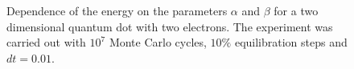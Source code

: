 	
	\begin{figure}[!hbt]
    \begin{center}
      \caption{Dependence of the energy on the parameters $\alpha$ and $\beta$ for a two dimensional quantum dot with two electrons. The experiment was carried out with $10^7$ Monte Carlo cycles, $10 \%$ equilibration steps and $dt = 0.01$.}
      \label{alphaBeta2DQDot2e}
    \end{center}
  \end{figure}
	
